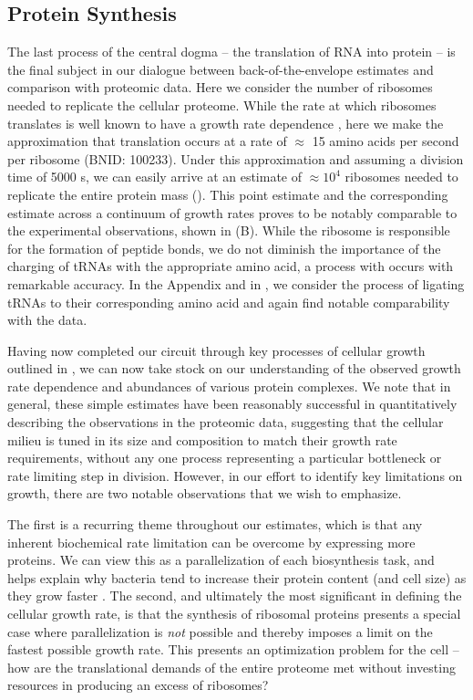 \subsection{Protein Synthesis}
The last process of the central dogma -- the translation of RNA into protein
-- is the final subject in our dialogue between back-of-the-envelope
estimates and comparison with proteomic data. Here we consider the number of
ribosomes needed to replicate the cellular proteome. While the rate at which
ribosomes translates is well known to have a growth rate dependence
\cite{dai2018}, here we make the approximation that translation occurs at a
rate of $\approx$ 15 amino acids per second per ribosome (BNID: 100233).
Under this approximation and assuming a division time of 5000 s, we can
easily arrive at an estimate of $\approx 10^4$ ribosomes needed to replicate
the entire protein mass (). This point estimate and
the corresponding estimate across a continuum of growth rates proves to be
notably comparable to the experimental observations, shown in
(B). While the ribosome is responsible for the
formation of peptide bonds, we do not diminish the importance of the charging
of tRNAs with the appropriate amino acid, a process with occurs with
remarkable accuracy. In the Appendix and in
, we consider the process of ligating tRNAs
to their corresponding amino acid and again find notable comparability with
the data.

Having now completed our circuit through key processes of cellular growth
outlined in , we can now take stock on our understanding of
the observed growth rate dependence and abundances of various protein
complexes. We note that in general, these simple estimates have been
reasonably successful in quantitatively describing the observations in the
proteomic data, suggesting that the cellular milieu is tuned in its size and
composition to match their growth rate requirements, without any one process
representing a particular bottleneck or rate limiting step in division.
However, in our effort to identify key limitations on growth, there are two
notable observations that we wish to emphasize.

The first is a recurring theme throughout our estimates, which is that any
inherent biochemical rate limitation can be overcome by expressing more
proteins. We can view this as a parallelization of each biosynthesis task,
and helps explain why bacteria tend to increase their protein content (and
cell size) as they grow faster \citep{ojkic2019}. The second, and ultimately
the most significant in defining the cellular growth rate, is that the
synthesis of ribosomal proteins presents a special case where parallelization
is \textit{not} possible and thereby imposes a limit on the fastest possible
growth rate. This presents an optimization problem for
the cell -- how are the translational demands of the entire proteome met without
investing resources in producing an excess of ribosomes?




